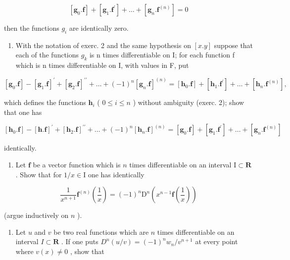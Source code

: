 \[
[ \mathbf {g} _ {0}. \mathbf {f} ] + [ \mathbf {g} _ {1}. \mathbf {f} ^ {\prime} ] + \dots + [ \mathbf {g} _ {n}. \mathbf {f} ^ {(n)} ] = 0
\]

then the functions \(g_{i}\) are identically zero.

\begin{enumerate}
\def\labelenumi{\arabic{enumi})}
\setcounter{enumi}{2}
\tightlist
\item
  With the notation of exerc. 2 and the same hypothesis on \([x.y]\) suppose that each of the functions \(g_{k}\) is n times differentiable on I; for each function f which is n times differentiable on I, with values in F, put
\end{enumerate}

\[
[ \mathbf {g} _ {0}. \mathbf {f} ] - [ \mathbf {g} _ {1}. \mathbf {f} ] ^ {\prime} + [ \mathbf {g} _ {2}. \mathbf {f} ] ^ {\prime \prime} + \dots + (- 1) ^ {n} [ \mathbf {g} _ {n}. \mathbf {f} ] ^ {(n)} = [ \mathbf {h} _ {0}. \mathbf {f} ] + [ \mathbf {h} _ {1}. \mathbf {f} ^ {\prime} ] + \dots + [ \mathbf {h} _ {n}. \mathbf {f} ^ {(n)} ],
\]

which defines the functions \(\mathbf{h}_i\) ( \(0 \leqslant i \leqslant n\) ) without ambiguity (exerc. 2); show that one has

\[
[ \mathbf {h} _ {0}. \mathbf {f} ] - [ \mathbf {h}. \mathbf {f} ] ^ {\prime} + [ \mathbf {h} _ {2}. \mathbf {f} ] ^ {\prime \prime} + \dots + (- 1) ^ {n} [ \mathbf {h} _ {n}. \mathbf {f} ] ^ {(n)} = [ \mathbf {g} _ {0}. \mathbf {f} ] + [ \mathbf {g} _ {1}. \mathbf {f} ^ {\prime} ] + \dots + [ \mathbf {g} _ {n}. \mathbf {f} ^ {(n)} ]
\]

identically.

\begin{enumerate}
\def\labelenumi{\arabic{enumi})}
\setcounter{enumi}{3}
\tightlist
\item
  Let \(\mathbf{f}\) be a vector function which is \(n\) times differentiable on an interval \(\mathrm{I} \subset \mathbf{R}\) . Show that for \(1 / x \in \mathrm{I}\) one has identically
\end{enumerate}

\[
\frac {1}{x ^ {n + 1}} \mathbf {f} ^ {(n)} \left(\frac {1}{x}\right) = (- 1) ^ {n} \mathrm{D} ^ {n} \left(x ^ {n - 1} \mathbf {f} \left(\frac {1}{x}\right)\right)
\]

(argue inductively on \(n\) ).

\begin{enumerate}
\def\labelenumi{\arabic{enumi})}
\setcounter{enumi}{4}
\tightlist
\item
  Let \(u\) and \(v\) be two real functions which are \(n\) times differentiable on an interval \(I \subset \mathbf{R}\) . If one puts \(D^n(u / v) = (-1)^n w_n / v^{n+1}\) at every point where \(v(x) \neq 0\) , show that
\end{enumerate}

